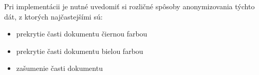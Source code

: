 Pri implementácii je nutné uvedomiť si rozličné spôsoby anonymizovania týchto dát, z ktorých najčastejšími sú:
\begin{itemize}
    \item prekrytie časti dokumentu čiernou farbou
    \item prekrytie časti dokumentu bielou farbou
    \item zašumenie časti dokumentu
\end{itemize}




